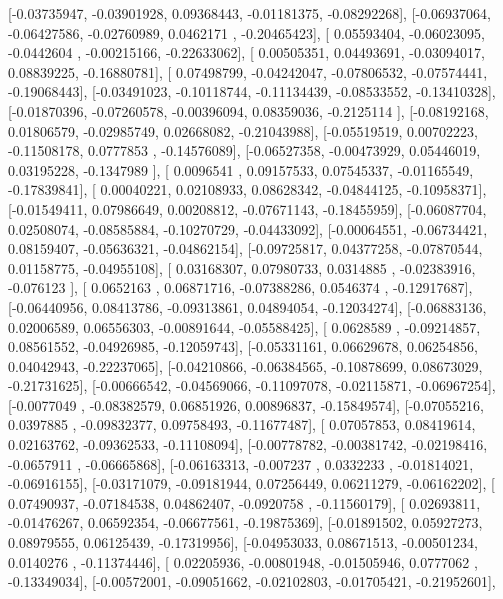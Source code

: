 \documentclass{article}
\begin{document}
       [-0.03735947, -0.03901928,  0.09368443, -0.01181375, -0.08292268],
       [-0.06937064, -0.06427586, -0.02760989,  0.0462171 , -0.20465423],
       [ 0.05593404, -0.06023095, -0.0442604 , -0.00215166, -0.22633062],
       [ 0.00505351,  0.04493691, -0.03094017,  0.08839225, -0.16880781],
       [ 0.07498799, -0.04242047, -0.07806532, -0.07574441, -0.19068443],
       [-0.03491023, -0.10118744, -0.11134439, -0.08533552, -0.13410328],
       [-0.01870396, -0.07260578, -0.00396094,  0.08359036, -0.2125114 ],
       [-0.08192168,  0.01806579, -0.02985749,  0.02668082, -0.21043988],
       [-0.05519519,  0.00702223, -0.11508178,  0.0777853 , -0.14576089],
       [-0.06527358, -0.00473929,  0.05446019,  0.03195228, -0.1347989 ],
       [ 0.0096541 ,  0.09157533,  0.07545337, -0.01165549, -0.17839841],
       [ 0.00040221,  0.02108933,  0.08628342, -0.04844125, -0.10958371],
       [-0.01549411,  0.07986649,  0.00208812, -0.07671143, -0.18455959],
       [-0.06087704,  0.02508074, -0.08585884, -0.10270729, -0.04433092],
       [-0.00064551, -0.06734421,  0.08159407, -0.05636321, -0.04862154],
       [-0.09725817,  0.04377258, -0.07870544,  0.01158775, -0.04955108],
       [ 0.03168307,  0.07980733,  0.0314885 , -0.02383916, -0.076123  ],
       [ 0.0652163 ,  0.06871716, -0.07388286,  0.0546374 , -0.12917687],
       [-0.06440956,  0.08413786, -0.09313861,  0.04894054, -0.12034274],
       [-0.06883136,  0.02006589,  0.06556303, -0.00891644, -0.05588425],
       [ 0.0628589 , -0.09214857,  0.08561552, -0.04926985, -0.12059743],
       [-0.05331161,  0.06629678,  0.06254856,  0.04042943, -0.22237065],
       [-0.04210866, -0.06384565, -0.10878699,  0.08673029, -0.21731625],
       [-0.00666542, -0.04569066, -0.11097078, -0.02115871, -0.06967254],
       [-0.0077049 , -0.08382579,  0.06851926,  0.00896837, -0.15849574],
       [-0.07055216,  0.0397885 , -0.09832377,  0.09758493, -0.11677487],
       [ 0.07057853,  0.08419614,  0.02163762, -0.09362533, -0.11108094],
       [-0.00778782, -0.00381742, -0.02198416, -0.0657911 , -0.06665868],
       [-0.06163313, -0.007237  ,  0.0332233 , -0.01814021, -0.06916155],
       [-0.03171079, -0.09181944,  0.07256449,  0.06211279, -0.06162202],
       [ 0.07490937, -0.07184538,  0.04862407, -0.0920758 , -0.11560179],
       [ 0.02693811, -0.01476267,  0.06592354, -0.06677561, -0.19875369],
       [-0.01891502,  0.05927273,  0.08979555,  0.06125439, -0.17319956],
       [-0.04953033,  0.08671513, -0.00501234,  0.0140276 , -0.11374446],
       [ 0.02205936, -0.00801948, -0.01505946,  0.0777062 , -0.13349034],
       [-0.00572001, -0.09051662, -0.02102803, -0.01705421, -0.21952601],
\end{document}
